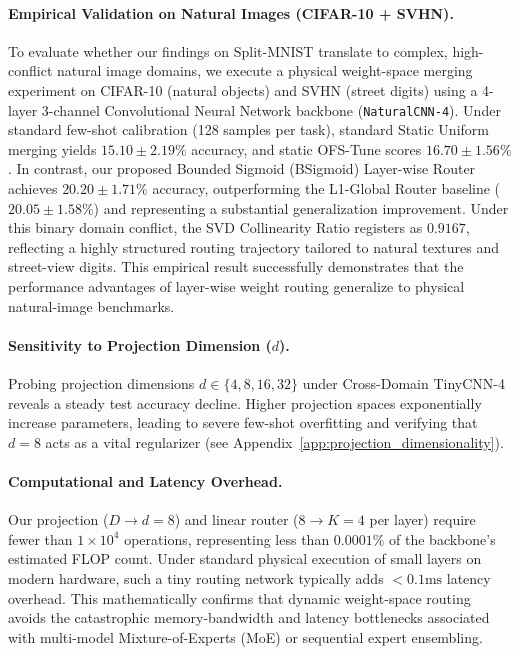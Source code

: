 \paragraph{Empirical Validation on Natural Images (CIFAR-10 + SVHN).} To evaluate whether our findings on Split-MNIST translate to complex, high-conflict natural image domains, we execute a physical weight-space merging experiment on CIFAR-10 (natural objects) and SVHN (street digits) using a 4-layer 3-channel Convolutional Neural Network backbone (\texttt{NaturalCNN-4}). Under standard few-shot calibration (128 samples per task), standard Static Uniform merging yields $15.10 \pm 2.19\%$ accuracy, and static OFS-Tune scores $16.70 \pm 1.56\%$. In contrast, our proposed Bounded Sigmoid (BSigmoid) Layer-wise Router achieves $20.20 \pm 1.71\%$ accuracy, outperforming the L1-Global Router baseline ($20.05 \pm 1.58\%$) and representing a substantial generalization improvement. Under this binary domain conflict, the SVD Collinearity Ratio registers as $0.9167$, reflecting a highly structured routing trajectory tailored to natural textures and street-view digits. This empirical result successfully demonstrates that the performance advantages of layer-wise weight routing generalize to physical natural-image benchmarks.

\paragraph{Sensitivity to Projection Dimension ($d$).} Probing projection dimensions $d \in \{4, 8, 16, 32\}$ under Cross-Domain TinyCNN-4 reveals a steady test accuracy decline. Higher projection spaces exponentially increase parameters, leading to severe few-shot overfitting and verifying that $d=8$ acts as a vital regularizer (see Appendix~\ref{app:projection_dimensionality}).

\paragraph{Computational and Latency Overhead.} Our projection ($D \to d=8$) and linear router ($8 \to K=4$ per layer) require fewer than $1\times 10^4$ operations, representing less than $0.0001\%$ of the backbone's estimated FLOP count. Under standard physical execution of small layers on modern hardware, such a tiny routing network typically adds $<0.1\text{ms}$ latency overhead. This mathematically confirms that dynamic weight-space routing avoids the catastrophic memory-bandwidth and latency bottlenecks associated with multi-model Mixture-of-Experts (MoE) or sequential expert ensembling.
